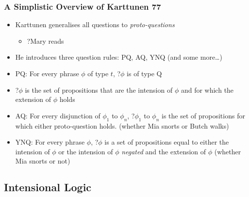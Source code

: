 \documentclass{beamer}
\begin{document}
\begin{frame}
  \frametitle{A Simplistic Overview of Karttunen 77}
  \begin{itemize}
    \item Karttunen generalises all questions to \emph{proto-questions}
      \begin{itemize}
	\item ?Mary reads
      \end{itemize}
    \item He introduces three question rules: PQ, AQ, YNQ (and some more\dots)
    \item PQ: For every phrase $\phi$ of type $t$, ?$\phi$ is of type Q
    \item ?$\phi$ is the set of propositions that are the intension of $\phi$
      and for which the extension of $\phi$ holds
    \item AQ: For every disjunction of $\phi_1$ to $\phi_n$, ?$\phi_1$ to
      $\phi_n$ is the set of propositions for which either proto-question holds.
      (whether Mia snorts or Butch walks)
    \item YNQ: For every phrase $\phi$, ?$\phi$ is a set of propositions equal
      to either the intension of $\phi$ or the intension of $\phi$
      \emph{negated} \alert{and} the extension of $\phi$
      (whether Mia snorts or not)
  \end{itemize}
\end{frame}


\subsection{Intensional Logic}
\end{document}

